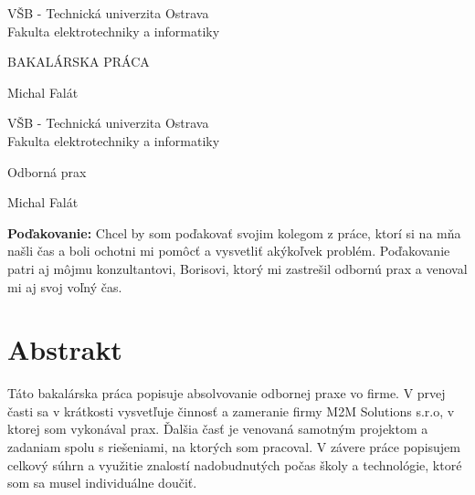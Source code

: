\documentclass[11pt, oneside]{report}
\def\mfrok{2018}
\def\mfnazov{BAKALÁRSKA PRÁCA}
\def\mfnazovprace{Odborná prax}
\def\mfautor{Michal Falát}
\begin{document}
  


\thispagestyle{empty}

\begin{center}
\sc\large
VŠB - Technická univerzita Ostrava\\
Fakulta elektrotechniky a informatiky


\vfill

{\LARGE\mfnazov}\\
\end{center}

\vfill

{\sc\large 
\noindent \mfrok \hfill  \hfill \mfautor
}

\eject %


\thispagestyle{empty}
\noindent

\begin{center}
\sc  
\large
V\v SB - Technická univerzita Ostrava\\
Fakulta elektrotechniky a informatiky

\vfill

{\LARGE\mfnazovprace}\\
\end{center}

\vfill



{\sc\large 
\noindent \mfrok \hfill  \hfill \mfautor
}

\eject %
\setcounter{page}{3}
\newpage 


\setcounter{page}{4}

\vfill
{\bf Poďakovanie:} Chcel by som poďakovať svojim kolegom  z práce, ktorí si na mňa našli čas a boli ochotni mi pomôcť a vysvetliť akýkoľvek problém. Poďakovanie patri aj môjmu konzultantovi, Borisovi, ktorý mi zastrešil odbornú prax a venoval mi aj svoj voľný čas.


\newpage 
\section*{Abstrakt}


Táto bakalárska práca popisuje absolvovanie odbornej praxe vo firme. V prvej časti  sa  v krátkosti   vysvetľuje činnosť a  zameranie firmy M2M Solutions s.r.o, v ktorej som   vykonával prax. Ďalšia  časť je venovaná samotným projektom a  zadaniam  spolu s riešeniami, na ktorých som pracoval. V závere práce popisujem   celkový súhrn  a využitie  znalostí  nadobudnutých počas školy a technológie, ktoré  som sa musel individuálne doučiť.
\end{document}
